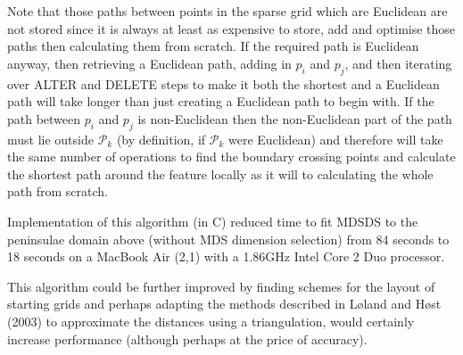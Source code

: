 \documentclass[useAMS, referee]{biom}
\begin{document}
Note that those paths between points in the sparse grid which are Euclidean are not stored since it is always at least as expensive to store, add and optimise those paths then calculating them from scratch. If the required path is Euclidean anyway, then retrieving a Euclidean path, adding in $p_i$ and $p_j$, and then iterating over ALTER and DELETE steps to make it both the shortest and a Euclidean path will take longer than just creating a Euclidean path to begin with. If the path between $p_i$ and $p_j$ is non-Euclidean then the non-Euclidean part of the path must lie outside $\mathcal{P}_k$ (by definition, if $\mathcal{P}_k$ were Euclidean) and therefore will take the same number of operations to find the boundary crossing points and calculate the shortest path around the feature locally as it will to calculating the whole path from scratch.

Implementation of this algorithm (in C) reduced time to fit MDSDS to the peninsulae domain above (without MDS dimension selection) from 84 seconds to 18 seconds on a MacBook Air (2,1) with a 1.86GHz Intel Core 2 Duo processor.

This algorithm could be further improved by finding schemes for the layout of starting grids and perhaps adapting the methods described in L{\o}land and H{\o}st (2003) to approximate the distances using a triangulation, would certainly increase performance (although perhaps at the price of accuracy).
\end{document}
